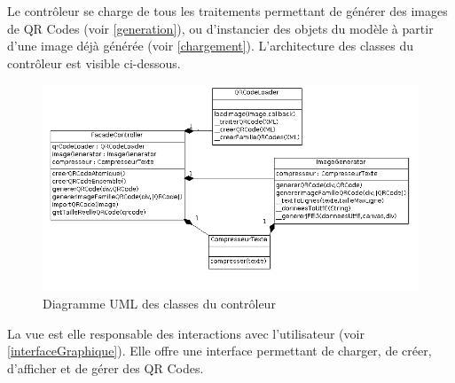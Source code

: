 \par
Le contrôleur se charge de tous les traitements permettant de générer des images de QR Codes (voir \ref{generation}), ou d'instancier des objets du modèle à partir d'une image déjà générée (voir \ref{chargement}). L'architecture des classes du contrôleur est visible ci-dessous.


\begin{figure}[!h]
	\centering
   \includegraphics[scale=0.4]{img/controllerUML.png}
   \caption{Diagramme UML des classes du contrôleur}
\end{figure}

\par
La vue est elle responsable des interactions avec l'utilisateur (voir \ref{interfaceGraphique}). Elle offre une interface permettant de charger, de créer, d'afficher et de gérer des QR Codes.